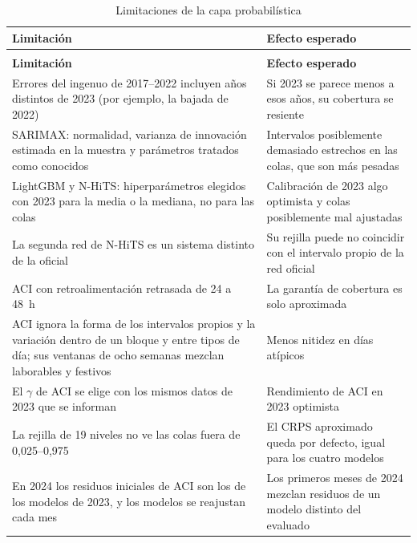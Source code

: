 {\small
\begin{xltabular}{\textwidth}{>{\raggedright\arraybackslash}p{5.6cm} >{\raggedright\arraybackslash}X}
	\caption{Limitaciones de la capa probabilística}
	\label{tab:limitaciones-probabilistica} \\
	\hline
	\textbf{Limitación} & \textbf{Efecto esperado} \\
	\hline
	\endfirsthead
	 \\
	\hline
	\textbf{Limitación} & \textbf{Efecto esperado} \\
	\hline
	\endhead
	\hline
	\endfoot
		Errores del ingenuo de 2017--2022 incluyen años distintos de 2023 (por ejemplo, la bajada de 2022) & Si 2023 se parece menos a esos años, su cobertura se resiente \\
		SARIMAX: normalidad, varianza de innovación estimada en la muestra y parámetros tratados como conocidos & Intervalos posiblemente demasiado estrechos en las colas, que son más pesadas \\
		LightGBM y N-HiTS: hiperparámetros elegidos con 2023 para la media o la mediana, no para las colas & Calibración de 2023 algo optimista y colas posiblemente mal ajustadas \\
		La segunda red de N-HiTS es un sistema distinto de la oficial & Su rejilla puede no coincidir con el intervalo propio de la red oficial \\
		ACI con retroalimentación retrasada de 24 a 48~h & La garantía de cobertura es solo aproximada \\
		ACI ignora la forma de los intervalos propios y la variación dentro de un bloque y entre tipos de día; sus ventanas de ocho semanas mezclan laborables y festivos & Menos nitidez en días atípicos \\
		El $\gamma$ de ACI se elige con los mismos datos de 2023 que se informan & Rendimiento de ACI en 2023 optimista \\
		La rejilla de 19 niveles no ve las colas fuera de 0,025--0,975 & El CRPS aproximado queda por defecto, igual para los cuatro modelos \\
		En 2024 los residuos iniciales de ACI son los de los modelos de 2023, y los modelos se reajustan cada mes & Los primeros meses de 2024 mezclan residuos de un modelo distinto del evaluado \\
\end{xltabular}
}

\FloatBarrier


